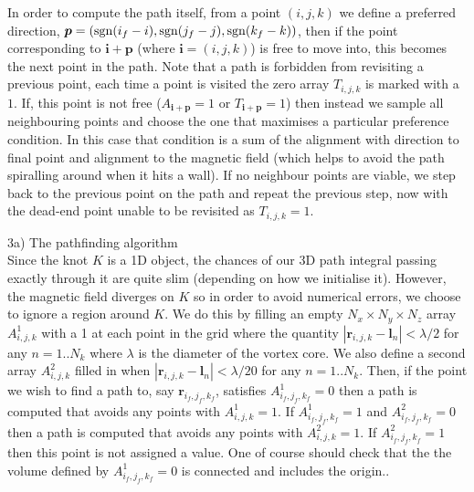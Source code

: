 \documentclass[notitlepage,aps,amsmath,amssymb,11pt]{revtex4-1}
\newcommand{\norm}[1]{\left| #1 \right|}
\renewcommand{\vec}[1]{\boldsymbol{#1}}
\begin{document}
In order to compute the path itself, from a point $(i,j,k)$ we define a preferred direction, $\vec{p} = ({\rm sgn}(i_f-i),{\rm sgn}(j_f-j),{\rm sgn}(k_f-k))$, then if the point corresponding to $\vec{i}+\vec{p}$ (where $\vec{i}=(i,j,k)$) is free to move into, this becomes the next point in the path. Note that a path is forbidden from revisiting a previous point, each time a point is visited the zero array $T_{i,j,k}$ is marked with a $1$. If, this point is not free ($A_{\vec{i}+\vec{p}}=1$ or $T_{\vec{i}+\vec{p}}=1$) then instead we sample all neighbouring points and choose the one that maximises a particular preference condition. In this case that condition is a sum of the alignment with direction to final point and alignment to the magnetic field (which helps to avoid the path spiralling around when it hits a wall). If no neighbour points are viable, we step back to the previous point on the path and repeat the previous step, now with the dead-end point unable to be revisited as $T_{i,j,k}=1$.



3a) The pathfinding algorithm\\

Since the knot $K$ is a 1D object, the chances of our 3D path integral passing exactly through it are quite slim (depending on how we initialise it). However, the magnetic field diverges on $K$ so in order to avoid numerical errors, we choose to ignore a region around $K$. We do this by filling an empty $N_x \times N_y \times N_z$ array $A^1_{i,j,k}$ with a 1 at each point in the grid where the quantity $\norm{\vec{r}_{i,j,k}-\vec{l}_n} < \lambda/2$ for any $n=1..N_k$ where $\lambda$ is the diameter of the vortex core. We also define a second array $A^2_{i,j,k}$ filled in when $\norm{\vec{r}_{i,j,k}-\vec{l}_n} < \lambda/20$ for any $n=1..N_k$. Then, if the point we wish to find a path to, say $\vec{r}_{i_f,j_f,k_f}$, satisfies $A^1_{i_f,j_f,k_f}=0$ then a path is computed that avoids any points with $A^1_{i,j,k}=1$. If $A^1_{i_f,j_f,k_f}=1$ and $A^2_{i_f,j_f,k_f}=0$ then a path is computed that avoids any points with $A^2_{i,j,k}=1$. If $A^2_{i_f,j_f,k_f}=1$ then this point is not assigned a value. One of course should check that the the volume defined by $A^1_{i_f,j_f,k_f}=0$ is connected and includes the origin..\\
\end{document}
